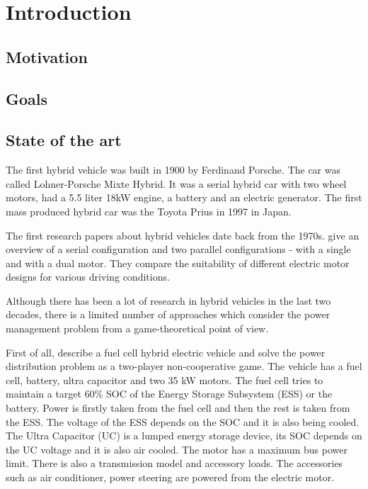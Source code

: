 \chapter{Introduction}
\label{chp:intro}

\section{Motivation}

\section{Goals}

\section{State of the art} 
The first hybrid vehicle was built in 1900 by Ferdinand Porsche. The car was called Lohner-Porsche Mixte Hybrid. It was a serial hybrid car with two wheel motors, had a 5.5 liter 18kW engine, a battery and an electric generator. The first mass produced hybrid car was the Toyota Prius in 1997 in Japan.

The first research papers about hybrid vehicles date back from the 1970s. \citet{lafrance1973electrical} give an overview of a serial configuration and two parallel configurations - with a single and with a dual motor. They compare the suitability of different electric motor designs for various driving conditions.

Although there has been a lot of research in hybrid vehicles in the last two decades, there is a limited number of approaches which consider the power management problem from a game-theoretical point of view.


First of all, \citet{gielniak2004power} describe a fuel cell hybrid electric vehicle and solve the power distribution problem as a two-player non-cooperative game. The vehicle has a fuel cell, battery, ultra capacitor and two 35 kW motors. The fuel cell tries to maintain a target 60\% SOC of the Energy Storage Subsystem (ESS) or the battery. Power is firstly taken from the fuel cell and then the rest is taken from the ESS. The voltage of the ESS depends on the SOC and it is also being cooled. The Ultra Capacitor (UC) is a lumped energy storage device, its SOC depends on the UC voltage and it is also air cooled. The motor has a maximum bus power limit. There is also a transmission model and accessory loads. The accessories such as air conditioner, power steering are powered from the electric motor.

